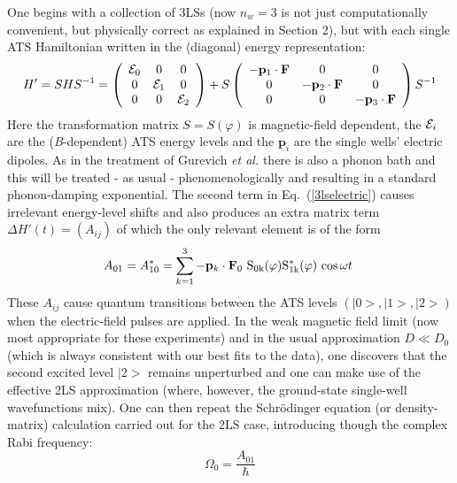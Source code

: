 \documentclass[10pt]{article}
\begin{document}
One begins with a collection of 3LSs (now $n_w=3$ is not just computationally 
convenient, but physically correct as explained in Section 2), but with each single 
ATS Hamiltonian written in the (diagonal) energy representation:
\begin{equation}H'=SHS^{-1}=\left( \begin{array}{ccc}
{\cal E }_0 & 0 & 0 \\
0 & {\cal E }_1 & 0 \\
0 & 0 & {\cal E }_2 \end{array}
\right)+S\left( \begin{array}{ccc}
-{{\mathbf p}}_1\cdot {\mathbf F} & 0 & 0 \\
0 & -{{\mathbf p}}_2\cdot {\mathbf F} & 0 \\
0 & 0 & -{{\mathbf p}}_3\cdot {\mathbf F} \end{array}
\right)S^{-1}
\label{3lselectric}
\end{equation}
Here the transformation matrix $S=S(\varphi)$ is magnetic-field dependent, the 
${\cal E }_i$\textit{ }are the (\textit{B}-dependent) ATS energy levels and the 
${{\mathbf p}}_i$ are the single wells' electric dipoles. As in the treatment of 
Gurevich \textit{et al.} \cite{Gur1990} there is also a phonon bath and this will be 
treated - as usual - phenomenologically and resulting in a standard phonon-damping 
exponential. The second term in Eq.~(\ref{3lselectric}) causes irrelevant 
energy-level shifts and also produces an extra matrix term $\Delta H'(t)=(A_{ij})$ 
of which the only relevant element is of the form
\begin{equation}
A_{01}=A^*_{10}=\sum^3_{k=1}{-{{\mathbf p}}_k\cdot {{\mathbf F}}_0{\rm \ }{{\rm S}}_{{\rm 0k}}{\rm (}\varphi{\rm )}{{\rm S}}^{{\rm *}}_{{\rm 1k}}{\rm (}\varphi{\rm )}}\ {\cos  \omega t\ }
\end{equation}
These $A_{ij}$ cause quantum transitions between the ATS levels $(|0>, |1>, |2>)$ 
when the electric-field pulses are applied. In the weak magnetic field limit (now 
most appropriate for these experiments) and in the usual approximation $D\ll D_0$  
(which is always consistent with our best fits to the data), one discovers that the 
second excited level $|2>$ remains unperturbed and one can make use of the 
effective 2LS approximation (where, however, the ground-state single-well 
wavefunctions mix). One can then repeat the Schr\"odinger equation (or 
density-matrix) calculation carried out for the 2LS case, introducing though the 
complex Rabi frequency:
\begin{equation}
{\Omega }_0= \frac{A_{01}}{\hbar}
\end{equation}
\end{document}
